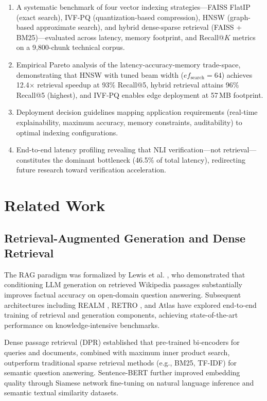 \documentclass[conference]{IEEEtran}
\begin{document}
\begin{enumerate}
    \item A systematic benchmark of four vector indexing strategies—FAISS FlatIP (exact search), IVF-PQ (quantization-based compression), HNSW (graph-based approximate search), and hybrid dense-sparse retrieval (FAISS + BM25)—evaluated across latency, memory footprint, and Recall@$K$ metrics on a 9,800-chunk technical corpus.
    
    \item Empirical Pareto analysis of the latency-accuracy-memory trade-space, demonstrating that HNSW with tuned beam width ($ef_{\text{search}}=64$) achieves 12.4$\times$ retrieval speedup at 93\% Recall@5, hybrid retrieval attains 96\% Recall@5 (highest), and IVF-PQ enables edge deployment at 57\,MB footprint.
    
    \item Deployment decision guidelines mapping application requirements (real-time explainability, maximum accuracy, memory constraints, auditability) to optimal indexing configurations.
    
    \item End-to-end latency profiling revealing that NLI verification—not retrieval—constitutes the dominant bottleneck (46.5\% of total latency), redirecting future research toward verification acceleration.
\end{enumerate}

\section{Related Work}

\subsection{Retrieval-Augmented Generation and Dense Retrieval}

The RAG paradigm was formalized by Lewis et al. \cite{lewis2020rag}, who demonstrated that conditioning LLM generation on retrieved Wikipedia passages substantially improves factual accuracy on open-domain question answering. Subsequent architectures including REALM \cite{guu2020realm}, RETRO \cite{borgeaud2022retro}, and Atlas \cite{izacard2022atlas} have explored end-to-end training of retrieval and generation components, achieving state-of-the-art performance on knowledge-intensive benchmarks.

Dense passage retrieval (DPR) \cite{karpukhin2020dense} established that pre-trained bi-encoders for queries and documents, combined with maximum inner product search, outperform traditional sparse retrieval methods (e.g., BM25, TF-IDF) for semantic question answering. Sentence-BERT \cite{reimers2019sbert} further improved embedding quality through Siamese network fine-tuning on natural language inference and semantic textual similarity datasets.
\end{document}
